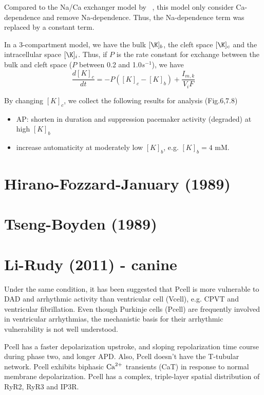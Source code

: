 Compared to the Na/Ca exchanger model by ~\citep{mullins1977mnc}, this model
only consider Ca-dependence and remove Na-dependence. Thus, the Na-dependence
term was replaced by a constant term.

In a 3-compartment model, we have the bulk $[\K]_b$, the cleft space $[\K]_c$
and the intracellular space $[\K]_i$. Thus, if $P$ is the rate constant for
exchange between the bulk and cleft space ($P$ between 0.2 and 1.0$s^{-1}$), we
have
\begin{equation}
  \label{eq:736}
  \frac{d[K]_c}{dt} = -P([K]_c - [K]_b) + \frac{I_{m,k}}{V_iF}
\end{equation}


By changing $[K]_c$, we collect the following results for analysis
(Fig.6,7.8)
\begin{itemize}
\item AP: shorten in duration and suppression pacemaker activity
  (degraded) at high $[K]_b$
\item increase automaticity  at moderately low $[K]_b$, e.g. $[K]_b=4$ mM.
\end{itemize}

\section{Hirano-Fozzard-January (1989)}

\citep{hirano1989}

\section{Tseng-Boyden (1989)}

\citep{tseng1989} 

\section{Li-Rudy (2011) - canine}

Under the same condition, it has been suggested that Pcell is more vulnerable to
DAD and arrhythmic activity than ventricular cell (Vcell), e.g. CPVT and
ventricular fibrillation. Even though Purkinje cells (Pcell) are frequently
involved in ventricular arrhythmias, the mechanistic basis for their arrhythmic
vulnerability is not well understood. 

Pcell has a faster depolarization upstroke, and sloping repolarization time
course during phase two, and longer APD. Also, Pcell doesn't have the T-tubular
network. Pcell exhibits biphasic ${\text{Ca}^{2+}}$ transients (CaT) in response to normal
membrane depolarization. Pcell has a complex, triple-layer spatial distribution
of RyR2, RyR3 and IP3R. 

